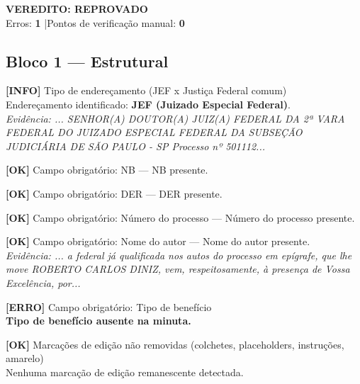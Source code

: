 \documentclass[12pt,a4paper]{article}
\newcommand{\statusOK}[1]{\textcolor{corOK}{\textbf{[OK]}} #1}
\newcommand{\statusERRO}[1]{\textcolor{corERRO}{\textbf{[ERRO]}} #1}
\newcommand{\statusINFO}[1]{\textcolor{corINFO}{\textbf{[INFO]}} #1}
\begin{document}
\vspace{0.5em}

\noindent\colorbox{corFundoReprovado}{%
  \begin{minipage}{\dimexpr\linewidth-2\fboxsep}
    \centering
    \vspace{0.3em}
    {\large \textcolor{corERRO}{\textbf{VEREDITO: REPROVADO}}}\\
    Erros: \textbf{1} \quad|\quad Pontos de verificação manual: \textbf{0}
    \vspace{0.3em}
  \end{minipage}%
}

\vspace{1em}


\subsection{Bloco 1 --- Estrutural}

\statusINFO{Tipo de endereçamento (JEF x Justiça Federal comum)}\\
Endereçamento identificado: \textbf{JEF (Juizado Especial Federal)}.\\
\textit{Evidência: ... SENHOR(A) DOUTOR(A) JUIZ(A) FEDERAL DA 2ª VARA FEDERAL DO JUIZADO ESPECIAL FEDERAL DA SUBSEÇÃO JUDICIÁRIA DE SÃO PAULO - SP Processo nº 501112...}

\medskip
\statusOK{Campo obrigatório: NB} --- NB presente.

\medskip
\statusOK{Campo obrigatório: DER} --- DER presente.

\medskip
\statusOK{Campo obrigatório: Número do processo} --- Número do processo presente.

\medskip
\statusOK{Campo obrigatório: Nome do autor} --- Nome do autor presente.\\
\textit{Evidência: ... a federal já qualificada nos autos do processo em epígrafe, que lhe move ROBERTO CARLOS DINIZ, vem, respeitosamente, à presença de Vossa Excelência, por...}

\medskip
\statusERRO{Campo obrigatório: Tipo de benefício}\\
\textbf{Tipo de benefício ausente na minuta.}

\medskip
\statusOK{Marcações de edição não removidas (colchetes, placeholders, instruções, amarelo)}\\
Nenhuma marcação de edição remanescente detectada.
\end{document}
